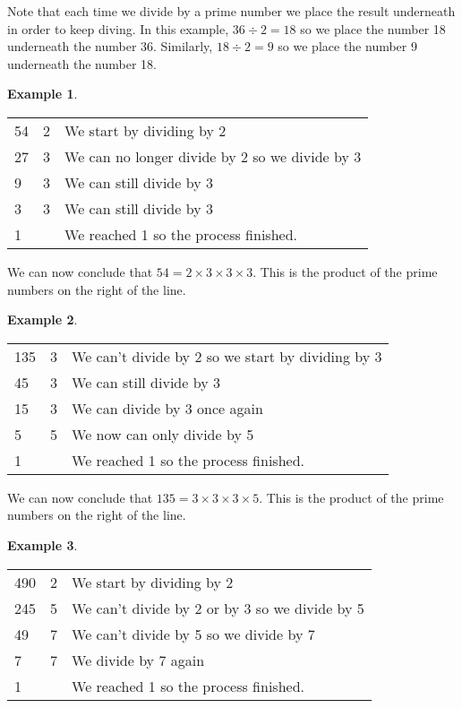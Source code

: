 \documentclass[11pt, oneside]{article}
\theoremstyle{definition}
\newtheorem{exmp}{Example}[section]
\begin{document}
Note that each time we divide by a prime number we place the result underneath in order to keep diving. In this example, $36 \div 2 = 18$ so we place the number 18 underneath the number 36. Similarly, $18 \div 2 = 9$ so we place the number 9 underneath the number 18.

\begin{exmp} \end{exmp}
\begin{tabular}{ p{0.5cm} | p{1.5cm}  p{10cm}}
54 & 2 & We start by dividing by 2 \\
27 & 3 & We can no longer divide by 2 so we divide by 3 \\
9 & 3 & We can still divide by 3 \\
3 & 3 & We can still divide by 3 \\
1 &  & We reached 1 so the process finished.
\end{tabular}

We can now conclude that $54 = 2\times 3\times 3\times 3$. This is the product of the prime numbers on the right of the line.

\begin{exmp} \end{exmp}
\begin{tabular}{ p{0.5cm} | p{1.5cm}  p{10cm}}
135 & 3 & We can't divide by 2 so we start by dividing by 3 \\
45 & 3 & We can still divide by 3  \\
15 & 3 & We can divide by 3 once again \\
5 & 5 & We now can only divide by 5 \\
1 &  & We reached 1 so the process finished.
\end{tabular}

We can now conclude that $135 = 3\times 3\times 3\times 5$. This is the product of the prime numbers on the right of the line.

\begin{exmp} \end{exmp}
\begin{tabular}{ p{0.5cm} | p{1.5cm}  p{10cm}}
490 & 2 & We start by dividing by 2 \\
245 & 5 & We can't divide by 2 or by 3 so we divide by 5  \\
49 & 7 & We can't divide by 5 so we divide by 7 \\
7 & 7 & We divide by 7 again \\
1 &  & We reached 1 so the process finished.
\end{tabular}
\end{document}
